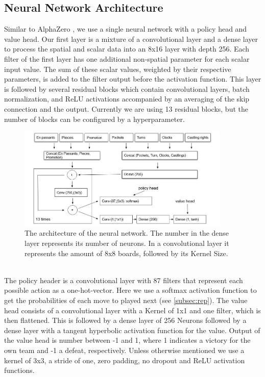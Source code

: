 \subsection{Neural Network Architecture}
\label{subsec:net}
Similar to AlphaZero \cite{alphazero}, we use a single neural network with a policy head and value head.
Our first layer is a mixture of a convolutional layer and a dense layer to process the spatial and scalar data into an 8x16 layer with depth 256.
Each filter of the first layer has one additional non-spatial parameter for each scalar input value.
The sum of these scalar values, weighted by their respective parameters, is added to the filter output before the activation function.
This layer is followed by several residual blocks which contain convolutional layers, batch normalization, and ReLU activations accompanied by an averaging of the skip connection and the output.
Currently we are using 13 residual blocks, but the number of blocks can be configured by a hyperparameter.
\\
\begin{figure}
	\centering
	\includegraphics[width=0.9\textwidth]{resources/architecture}
	\caption{The architecture of the neural network. The number in the dense layer represents its number of neurons. In a convolutional layer it represents the amount of 8x8 boards, followed by its Kernel Size.}
	\label{img:architecture}
\end{figure}
\\
The policy header is a convolutional layer with 87 filters that represent each possible action as a one-hot-vector.
Here we use a softmax activation function to get the probabilities of each move to played next (see \autoref{subsec:rep}).
The value head consists of a convolutional layer with a Kernel of 1x1 and one filter, which is then flattened.
This is followed by a dense layer of 256 Neurons followed by a dense layer with a tangent hyperbolic activation function for the value.
Output of the value head is number between -1 and 1, where 1 indicates a victory for the own team and -1 a defeat, respectively.
Unless otherwise mentioned we use a kernel of 3x3, a stride of one, zero padding, no dropout and ReLU activation functions.